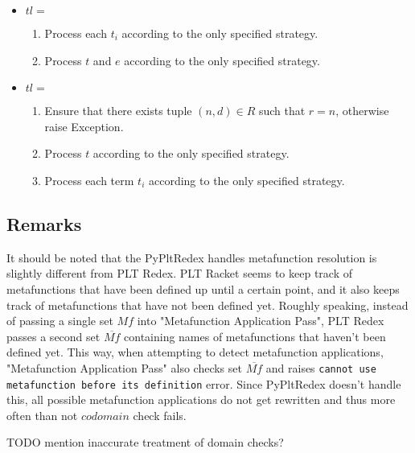 \begin{itemize}
\item $tl=$ \TermLetAssertEqual
	\begin{enumerate}
	\item  Process each $t_i$ according to the only specified strategy.
	\item Process $t$ and $e$ according to the only specified strategy.
	\end{enumerate}

\item $tl=$ \ApplyReductionRelationAssertEqual
	\begin{enumerate}
	\item Ensure that there exists tuple $(n, d) \in R$ such that $r=n$, otherwise raise Exception.
	\item Process $t$ according to the only specified strategy.
	\item Process each term $t_i$ according to the only specified strategy.
	\end{enumerate}
\end{itemize}

\subsection{Remarks}
It should be noted that the PyPltRedex handles metafunction resolution is slightly different from PLT Redex. PLT Racket seems to keep track of metafunctions that have been defined up until a certain point, and it also keeps track of metafunctions that have not been defined yet. Roughly speaking, instead of passing a single set $Mf$ into "Metafunction Application Pass", PLT Redex passes a second set $\overline{Mf}$ containing names of metafunctions that haven't been defined yet. This way, when attempting to detect metafunction applications, "Metafunction Application Pass" also checks set $\overline{Mf}$ and raises \lstinline{cannot use metafunction before its definition} error. Since PyPltRedex doesn't handle this, all possible metafunction applications do not get rewritten and thus more often than not $codomain$ check fails.

TODO mention inaccurate treatment of domain checks?
